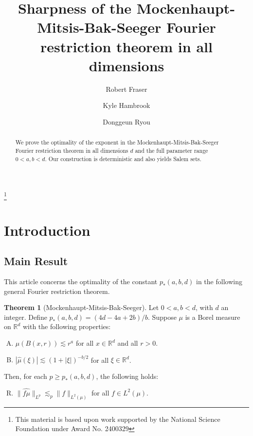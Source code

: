 \documentclass{amsart}
\numberwithin{equation}{section}
\theoremstyle{definition}
\newtheorem{thm}[theorem]{Theorem}
\theoremstyle{definition}
\def\RR{\mathbb{R}}
\begin{document}
\author{Robert Fraser \and Kyle Hambrook \and Donggeun Ryou}
\title[Sharpness of the Mockenhaupt-Mitsis-Bak-Seeger theorem]{Sharpness of the Mockenhaupt-Mitsis-Bak-Seeger  Fourier restriction theorem in all dimensions}

\thanks{This material is based upon work supported by the National Science Foundation under
Award No. 2400329}

\begin{abstract}
We prove the optimality of the exponent in the Mockenhaupt-Mitsis-Bak-Seeger Fourier restriction theorem in all dimensions $d$ and the full parameter range $0 < a,b < d$. Our construction is  deterministic and also yields Salem sets. 
\end{abstract}

\maketitle

\section{Introduction}
\subsection{Main Result}
This article concerns the optimality of 
the constant $p_{*}(a,b,d)$ in 
the following general Fourier restriction theorem. 








\begin{thm}[Mockenhaupt-Mitsis-Bak-Seeger]\label{frac ST}
Let $0 < a, b < d$, with $d$ an integer. 
Define $p_{*}(a,b,d) = (4d-4a+2b)/b.$
Suppose $\mu$ is a Borel  measure on $\RR^d$ with the following properties: 
\begin{enumerate}[(A)]
    \item $\mu(B(x,r)) 
\lesssim 
    r^{a}$ for all $x \in \RR^d$ and all $r > 0$.  
    \item $|\widehat{\mu}(\xi)| \lesssim 
    (1+|\xi|)^{-b/2}$ for all $\xi \in \RR^d$.  
\end{enumerate}
Then, for each $p \geq p_{*}(a,b,d)$, the following holds: 
\begin{enumerate}[(A)]
\setcounter{enumi}{17}
\item $\|\widehat{f\mu}\|_{L^p} 
\lesssim_p 
\|f\|_{L^2(\mu)}$ for all $f \in L^2(\mu)$.
\end{enumerate}
\end{thm}
\end{document}

